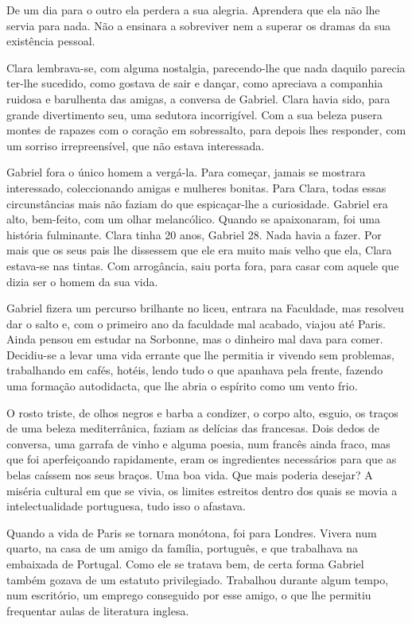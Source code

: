 De um dia para o outro ela perdera a sua alegria. Aprendera que ela não
lhe servia para nada. Não a ensinara a sobreviver nem a superar os
dramas da sua existência pessoal.

Clara lembrava-se, com alguma nostalgia, parecendo-lhe que nada daquilo
parecia ter-lhe sucedido, como gostava de sair e dançar, como apreciava
a companhia ruidosa e barulhenta das amigas, a conversa de Gabriel.
Clara havia sido, para grande divertimento seu, uma sedutora
incorrigível. Com a sua beleza pusera montes de rapazes com o coração em
sobressalto, para depois lhes responder, com um sorriso irrepreensível,
que não estava interessada.

Gabriel fora o único homem a vergá-la. Para começar, jamais se mostrara
interessado, coleccionando amigas e mulheres bonitas. Para Clara, todas
essas circunstâncias mais não faziam do que espicaçar-lhe a curiosidade.
Gabriel era alto, bem-feito, com um olhar melancólico. Quando se
apaixonaram, foi uma história fulminante. Clara tinha 20 anos, Gabriel
28. Nada havia a fazer. Por mais que os seus pais lhe dissessem que ele
era muito mais velho que ela, Clara estava-se nas tintas. Com
arrogância, saiu porta fora, para casar com aquele que dizia ser o homem
da sua vida.

Gabriel fizera um percurso brilhante no liceu, entrara na Faculdade, mas
resolveu dar o salto e, com o primeiro ano da faculdade mal acabado,
viajou até Paris. Ainda pensou em estudar na Sorbonne, mas o dinheiro
mal dava para comer. Decidiu-se a levar uma vida errante que lhe
permitia ir vivendo sem problemas, trabalhando em cafés, hotéis, lendo
tudo o que apanhava pela frente, fazendo uma formação autodidacta, que
lhe abria o espírito como um vento frio.

O rosto triste, de olhos negros e barba a condizer, o corpo alto,
esguio, os traços de uma beleza mediterrânica, faziam as delícias das
francesas. Dois dedos de conversa, uma garrafa de vinho e alguma poesia,
num francês ainda fraco, mas que foi aperfeiçoando rapidamente, eram os
ingredientes necessários para que as belas caíssem nos seus braços. Uma
boa vida. Que mais poderia desejar? A miséria cultural em que se vivia,
os limites estreitos dentro dos quais se movia a intelectualidade
portuguesa, tudo isso o afastava.

Quando a vida de Paris se tornara monótona, foi para Londres. Vivera num
quarto, na casa de um amigo da família, português, e que trabalhava na
embaixada de Portugal. Como ele se tratava bem, de certa forma Gabriel
também gozava de um estatuto privilegiado. Trabalhou durante algum
tempo, num escritório, um emprego conseguido por esse amigo, o que lhe
permitiu frequentar aulas de literatura inglesa.

